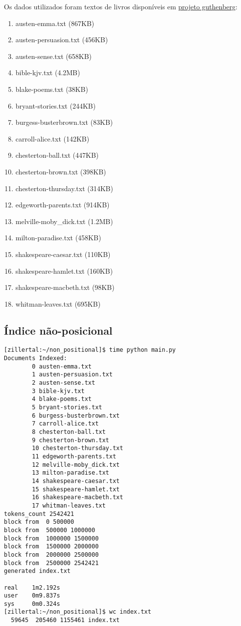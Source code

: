 \documentclass[a4paper]{article}
\begin{document}
Os dados utilizados foram textos de livros disponíveis em \href{https://www.gutenberg.org/}{projeto guthenberg}:

\begin{enumerate}
\item        austen-emma.txt (867KB)
\item       austen-persuasion.txt (456KB)
\item       austen-sense.txt (658KB)
\item       bible-kjv.txt (4.2MB)
\item       blake-poems.txt (38KB)
\item       bryant-stories.txt (244KB)
\item       burgess-busterbrown.txt (83KB)
\item       carroll-alice.txt (142KB)
\item       chesterton-ball.txt (447KB)
 \item      chesterton-brown.txt (398KB)
 \item      chesterton-thursday.txt (314KB)
 \item      edgeworth-parents.txt (914KB)
 \item      melville-moby_dick.txt (1.2MB)
 \item     milton-paradise.txt (458KB)
 \item     shakespeare-caesar.txt (110KB)
  \item    shakespeare-hamlet.txt (160KB)
  \item    shakespeare-macbeth.txt (98KB)
 \item     whitman-leaves.txt (695KB)
\end{enumerate}

        

\subsection{Índice não-posicional}

\begin{verbatim}
[zillertal:~/non_positional]$ time python main.py
Documents Indexed:
        0 austen-emma.txt
        1 austen-persuasion.txt
        2 austen-sense.txt
        3 bible-kjv.txt
        4 blake-poems.txt
        5 bryant-stories.txt
        6 burgess-busterbrown.txt
        7 carroll-alice.txt
        8 chesterton-ball.txt
        9 chesterton-brown.txt
        10 chesterton-thursday.txt
        11 edgeworth-parents.txt
        12 melville-moby_dick.txt
        13 milton-paradise.txt
        14 shakespeare-caesar.txt
        15 shakespeare-hamlet.txt
        16 shakespeare-macbeth.txt
        17 whitman-leaves.txt
tokens_count 2542421
block from  0 500000
block from  500000 1000000
block from  1000000 1500000
block from  1500000 2000000
block from  2000000 2500000
block from  2500000 2542421
generated index.txt

real    1m2.192s
user    0m9.837s
sys     0m0.324s
[zillertal:~/non_positional]$ wc index.txt
  59645  205460 1155461 index.txt
\end{verbatim}
\end{document}
